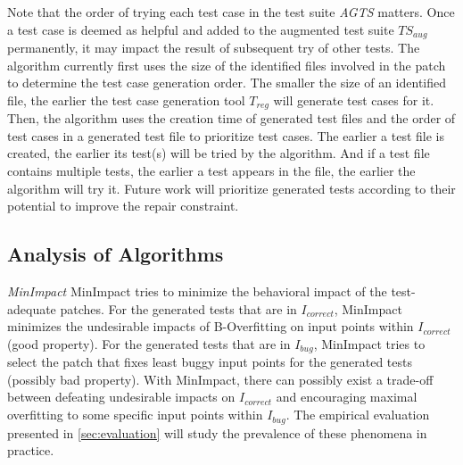 \documentclass[]{sig-alternate}
\begin{document}
Note that the order of trying each test case in the test suite \emph{AGTS} matters. Once a test case is deemed as helpful and added to the augmented test suite $TS_{aug}$ permanently, it may impact the result of subsequent try of other tests. The algorithm currently first uses the size of the identified files involved in the patch to determine the test case generation order. The smaller the size of an identified file, the earlier the test case generation tool $T_{reg}$ will generate test cases for it. Then, the algorithm uses the creation time of generated test files and the order of test cases in a generated test file to prioritize test cases. The earlier a test file is created, the earlier its test(s) will be tried by the algorithm. And if a test file contains multiple tests, the earlier a test appears in the file, the earlier the algorithm will try it. Future work will prioritize generated tests according to their potential to improve the repair constraint. 

\subsection{Analysis of Algorithms}
\label{sec:formal-analysis}

\emph{MinImpact}
MinImpact tries to minimize the behavioral impact of the test-adequate patches.
For the generated tests that are in $I_{correct}$, MinImpact minimizes the undesirable impacts of B-Overfitting on input points within $I_{correct}$ (good property). For the generated tests that are in $I_{bug}$, MinImpact tries to select the patch that fixes least buggy input points for the generated tests (possibly bad property). 
With MinImpact, there can possibly exist a trade-off between defeating undesirable impacts on $I_{correct}$ and encouraging maximal overfitting to some specific input points within $I_{bug}$.
The empirical evaluation presented in \autoref{sec:evaluation} will study the prevalence of these phenomena in practice.
\end{document}
